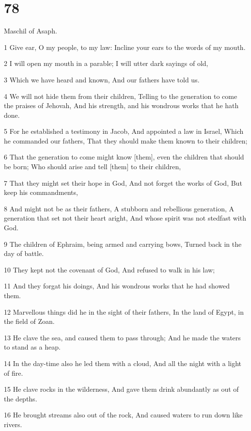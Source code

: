 \chapter{78}

\par Maschil of Asaph.

\par 1 Give ear, O my people, to my law: Incline your ears to the words of my mouth.
\par 2 I will open my mouth in a parable; I will utter dark sayings of old,
\par 3 Which we have heard and known, And our fathers have told us.
\par 4 We will not hide them from their children, Telling to the generation to come the praises of Jehovah, And his strength, and his wondrous works that he hath done.
\par 5 For he established a testimony in Jacob, And appointed a law in Israel, Which he commanded our fathers, That they should make them known to their children;
\par 6 That the generation to come might know [them], even the children that should be born; Who should arise and tell [them] to their children,
\par 7 That they might set their hope in God, And not forget the works of God, But keep his commandments,
\par 8 And might not be as their fathers, A stubborn and rebellious generation, A generation that set not their heart aright, And whose spirit was not stedfast with God.
\par 9 The children of Ephraim, being armed and carrying bows, Turned back in the day of battle.
\par 10 They kept not the covenant of God, And refused to walk in his law;
\par 11 And they forgat his doings, And his wondrous works that he had showed them.
\par 12 Marvellous things did he in the sight of their fathers, In the land of Egypt, in the field of Zoan.
\par 13 He clave the sea, and caused them to pass through; And he made the waters to stand as a heap.
\par 14 In the day-time also he led them with a cloud, And all the night with a light of fire.
\par 15 He clave rocks in the wilderness, And gave them drink abundantly as out of the depths.
\par 16 He brought streams also out of the rock, And caused waters to run down like rivers.
